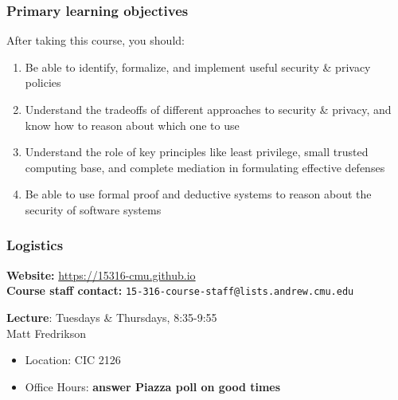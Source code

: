 \documentclass[10pt]{beamer}
\begin{document}

\begin{frame}

\frametitle{Primary learning objectives}

After taking this course, you should:
\begin{enumerate}
  \pause\item Be able to identify, formalize, and implement useful security \& privacy policies
  \pause\item Understand the tradeoffs of different approaches to security \& privacy, and know how to reason about which one to use
  \pause\item Understand the role of key principles like least privilege, small trusted computing base, and complete mediation in formulating effective defenses
  \pause\item Be able to use formal proof and deductive systems to reason about the security of software systems
\end{enumerate}

\end{frame}


\begin{frame}

\frametitle{Logistics}

\textbf{Website:} \url{https://15316-cmu.github.io}
\\[1em]

\textbf{Course staff contact:} \texttt{15-316-course-staff@lists.andrew.cmu.edu}

\textbf{Lecture}: Tuesdays \& Thursdays, 8:35-9:55
\\[1em]

Matt Fredrikson
\begin{itemize}
\item Location: CIC 2126
\item Office Hours: \textbf{answer Piazza poll on good times}
\end{itemize}

\end{frame}

\end{document}
